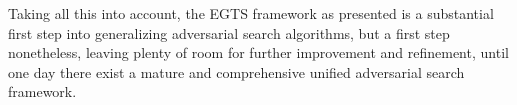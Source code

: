 Taking all this into account, the EGTS framework as presented is a substantial first step into generalizing adversarial search algorithms, but a first step nonetheless, leaving plenty of room for further improvement and refinement, until one day there exist a mature and comprehensive unified adversarial search framework.